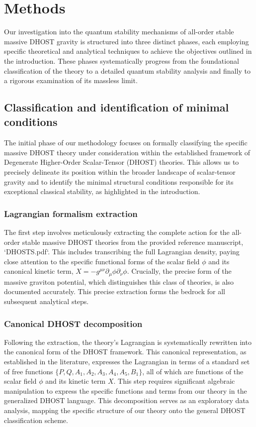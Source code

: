 \documentclass[twocolumn]{aastex631}
\begin{document}
\section{Methods}
\label{sec:methods}
Our investigation into the quantum stability mechanisms of all-order stable massive DHOST gravity is structured into three distinct phases, each employing specific theoretical and analytical techniques to achieve the objectives outlined in the introduction. These phases systematically progress from the foundational classification of the theory to a detailed quantum stability analysis and finally to a rigorous examination of its massless limit.

\subsection{Classification and identification of minimal conditions}
The initial phase of our methodology focuses on formally classifying the specific massive DHOST theory under consideration within the established framework of Degenerate Higher-Order Scalar-Tensor (DHOST) theories. This allows us to precisely delineate its position within the broader landscape of scalar-tensor gravity and to identify the minimal structural conditions responsible for its exceptional classical stability, as highlighted in the introduction.

\subsubsection{Lagrangian formalism extraction}
The first step involves meticulously extracting the complete action for the all-order stable massive DHOST theories from the provided reference manuscript, `DHOSTS.pdf`. This includes transcribing the full Lagrangian density, paying close attention to the specific functional forms of the scalar field $\phi$ and its canonical kinetic term, $X = -g^{\mu\nu}\partial_\mu\phi\partial_\nu\phi$. Crucially, the precise form of the massive graviton potential, which distinguishes this class of theories, is also documented accurately. This precise extraction forms the bedrock for all subsequent analytical steps.

\subsubsection{Canonical DHOST decomposition}
Following the extraction, the theory's Lagrangian is systematically rewritten into the canonical form of the DHOST framework. This canonical representation, as established in the literature, expresses the Lagrangian in terms of a standard set of free functions $\{P, Q, A_1, A_2, A_3, A_4, A_5, B_1\}$, all of which are functions of the scalar field $\phi$ and its kinetic term $X$. This step requires significant algebraic manipulation to express the specific functions and terms from our theory in the generalized DHOST language. This decomposition serves as an exploratory data analysis, mapping the specific structure of our theory onto the general DHOST classification scheme.
\end{document}
